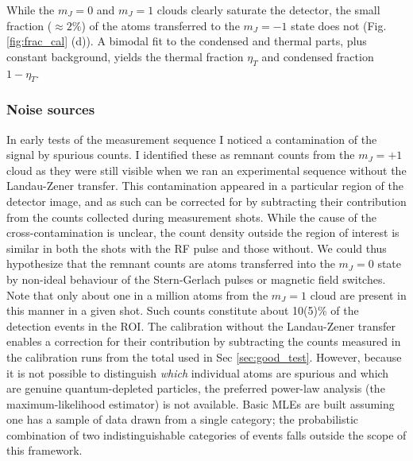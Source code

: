 	While the $m_J=0$ and $m_J=1$ clouds clearly saturate the detector, the small fraction ($\approx2\%$) of the atoms transferred to the $m_J=-1$ state does not (Fig. \ref{fig:frac_cal} (d)). 
	A bimodal fit to the condensed and thermal parts, plus constant background, yields the thermal fraction $\eta_T$ and condensed fraction $1-\eta_T$.


\subsubsection{Noise sources}
\label{sec:spinpop}

	In early tests of the measurement sequence I noticed a contamination of the signal by spurious counts. 
	I identified these as remnant counts from the $m_J=+1$ cloud as they were still visible when we ran an experimental sequence without the Landau-Zener transfer. 
	This contamination appeared in a particular region of the detector image, and as such can be corrected for by subtracting their contribution from the counts collected during measurement shots. 
	While the cause of the cross-contamination is unclear, the count density outside the region of interest is similar in both the shots with the RF pulse and those without. 
	We could thus hypothesize that the remnant counts are atoms transferred into the $m_J=0$ state by non-ideal behaviour of the Stern-Gerlach pulses or magnetic field switches. 
	Note that only about one in a million atoms from the $m_J=1$ cloud are present in this manner in a given shot.
	{Such counts constitute about 10(5)\% of the detection events in the ROI. 
	The calibration without the Landau-Zener transfer enables a correction for their contribution by subtracting the counts measured in the calibration runs from the total used in Sec \ref{sec:good_test}.
	However, because it is not possible to distinguish \emph{which} individual atoms are spurious and which are genuine quantum-depleted particles, the preferred power-law analysis (the maximum-likelihood estimator) is not available. 
	Basic MLEs are built assuming one has a sample of data drawn from a single category; the probabilistic combination of two indistinguishable categories of events falls outside the scope of this framework.}


